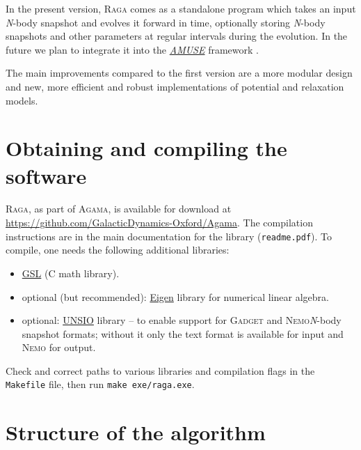 \documentclass[12pt]{article}
\newcommand{\Nbody}{\textsl{N}-body\xspace}
\newcommand{\Raga}{\textsc{Raga}\xspace}
\newcommand{\Agama}{\textsc{Agama}\xspace}
\newcommand{\Nemo}{\textsc{Nemo}\xspace}
\begin{document}
In the present version, \Raga comes as a standalone program which takes an input \Nbody snapshot and evolves it forward in time, optionally storing \Nbody snapshots and other parameters at regular intervals during the evolution. In the future we plan to integrate it into the \href{http://amusecode.org}{\textsl{AMUSE}} framework \cite{AMUSE}.

The main improvements compared to the first version are a more modular design and new, more efficient and robust implementations of potential and relaxation models.

\section{Obtaining and compiling the software}

\Raga, as part of \Agama, is available for download at\\ \url{https://github.com/GalacticDynamics-Oxford/Agama}. The compilation instructions are in the main documentation for the library (\texttt{readme.pdf}).
To compile, one needs the following additional libraries:
\begin{itemize}
\item \href{http://www.gnu.org/software/gsl/}{GSL} (C math library).
\item optional (but recommended): \href{http://eigen.tuxfamily.org/}{Eigen} library for numerical linear algebra.
\item optional: \href{http://projets.lam.fr/projects/unsio/}{UNSIO} library -- to enable support for \textsc{Gadget} and \Nemo \Nbody snapshot formats; without it only the text format is available for input and \Nemo for output.%
\end{itemize}
Check and correct paths to various libraries and compilation flags in the \texttt{Makefile} file, then run \texttt{make exe/raga.exe}.

\section{Structure of the algorithm}  \label{sec:algorithm}
\end{document}
